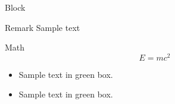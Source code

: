\documentclass{beamer}
\begin{document}
\begin{frame}{Block}
\begin{block}{Remark}
Sample text
\end{block}
\begin{alertblock}{Math}
\[
E = m c^2
\]
\end{alertblock}

\begin{examples}
\begin{itemize}
\item Sample text in green box.
\item Sample text in green box.
\end{itemize}
\end{examples}
\end{frame}
\end{document}
